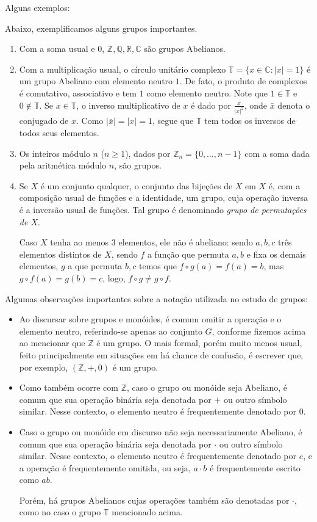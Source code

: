 Alguns exemplos:

\begin{exemplo}Abaixo, exemplificamos alguns grupos importantes.
    \begin{enumerate}[label=\alph*)]
        \item Com a soma usual e $0$, $\mathbb{Z, Q, R, C}$ são grupos Abelianos.
        \item Com a multiplicação usual, o círculo unitário complexo $\mathbb T=\{x \in \mathbb C: |x|=1\}$ é um grupo Abeliano com elemento neutro $1$.
        De fato, o produto de complexos é comutativo, associativo e tem $1$ como elemento neutro.
        Note que $1\in \mathbb T$ e $0\notin \mathbb T$.
        Se $x \in \mathbb T$, o inverso multiplicativo de $x$ é dado por $\frac{\bar x}{|x|^2}$, onde $\bar x$ denota o conjugado de $x$.
        Como $|\bar x|=|x|=1$, segue que $\mathbb T$ tem todos os inversos de todos seus elementos.
        \item Os inteiros módulo $n$ ($n\geq 1$), dados por $\mathbb Z_n=\{0, \dots, n-1\}$ com a soma dada pela aritmética módulo $n$, são grupos.
        \item Se $X$ é um conjunto qualquer, o conjunto das bijeções de $X$ em $X$ é, com a composição usual de funções e a identidade, um grupo, cuja operação inversa é a inversão usual de funções.
        Tal grupo é denominado \emph{grupo de permutações de $X$}.
        
        Caso $X$ tenha ao menos $3$ elementos, ele não é abeliano: sendo $a, b, c$ três elementos distintos de $X$, sendo $f$ a função que permuta $a, b$ e fixa os demais elementos, $g$ a que permuta $b, c$ temos que $f\circ g(a)=f(a)=b$, mas $g\circ f(a)=g(b)=c$, logo, $f\circ g\neq g\circ f$.
    \end{enumerate}
\end{exemplo}

Algumas observações importantes sobre a notação utilizada no estudo de grupos:
\begin{itemize}
\item Ao discursar sobre grupos e monóides, é comum omitir a operação e o elemento neutro, referindo-se apenas ao conjunto $G$, conforme fizemos acima ao mencionar que $\mathbb Z$ é um grupo.
O mais formal, porém muito menos usual, feito principalmente em situações em há chance de confusão, é escrever que, por exemplo, $(\mathbb Z, +, 0)$ é um grupo.
\item Como também ocorre com $\mathbb Z$, caso o grupo ou monóide seja Abeliano, é comum que sua operação binária seja denotada por $+$ ou outro símbolo similar.
Nesse contexto, o elemento neutro é frequentemente denotado por $0$.
\item Caso o grupo ou monóide em discurso não seja necessariamente Abeliano, é comum que sua operação binária seja denotada por $\cdot$ ou outro símbolo similar.
Nesse contexto, o elemento neutro é frequentemente denotado por $e$, e a operação é frequentemente omitida, ou seja, $a \cdot b$ é frequentemente escrito como $ab$.

Porém, há grupos Abelianos cujas operações também são denotadas por $\cdot$, como no caso o grupo $\mathbb T$ mencionado acima.
\end{itemize}


